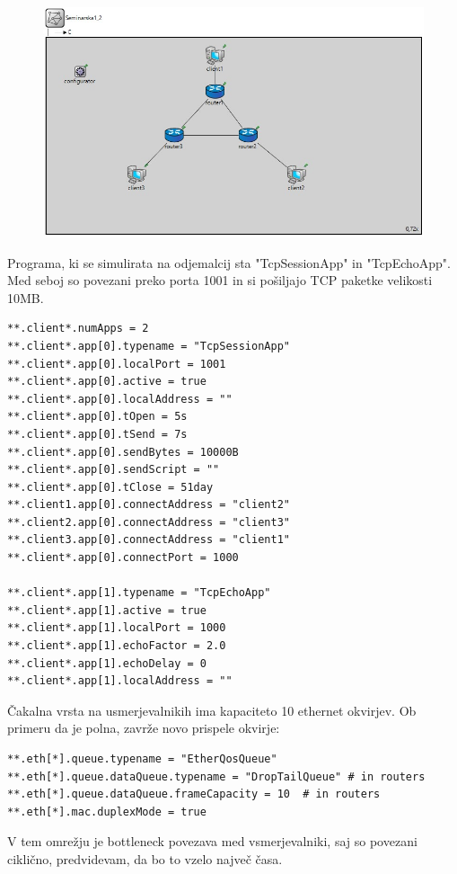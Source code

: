 \documentclass[11pt,a4paper,slovene]{myarticle}
\begin{document}
\begin{figure}[h]
  \includegraphics[width=\linewidth]{omrezje2.jpg}
\end{figure}

Programa, ki se simulirata na odjemalcij sta "TcpSessionApp" in "TcpEchoApp". Med seboj so povezani preko porta 1001 in si pošiljajo TCP paketke velikosti 10MB.

\begin{lstlisting}
**.client*.numApps = 2
**.client*.app[0].typename = "TcpSessionApp"
**.client*.app[0].localPort = 1001
**.client*.app[0].active = true
**.client*.app[0].localAddress = ""
**.client*.app[0].tOpen = 5s
**.client*.app[0].tSend = 7s
**.client*.app[0].sendBytes = 10000B
**.client*.app[0].sendScript = ""
**.client*.app[0].tClose = 51day
**.client1.app[0].connectAddress = "client2"
**.client2.app[0].connectAddress = "client3"
**.client3.app[0].connectAddress = "client1"
**.client*.app[0].connectPort = 1000

**.client*.app[1].typename = "TcpEchoApp"
**.client*.app[1].active = true
**.client*.app[1].localPort = 1000
**.client*.app[1].echoFactor = 2.0
**.client*.app[1].echoDelay = 0
**.client*.app[1].localAddress = ""
\end{lstlisting}

Čakalna vrsta na usmerjevalnikih ima kapaciteto 10 ethernet okvirjev. Ob primeru da je polna, zavrže novo prispele okvirje:
\begin{lstlisting}
**.eth[*].queue.typename = "EtherQosQueue"
**.eth[*].queue.dataQueue.typename = "DropTailQueue" # in routers
**.eth[*].queue.dataQueue.frameCapacity = 10  # in routers
**.eth[*].mac.duplexMode = true
\end{lstlisting}

V tem omrežju je bottleneck povezava med vsmerjevalniki, saj so povezani ciklično, predvidevam, da bo to vzelo največ časa.
\end{document}

